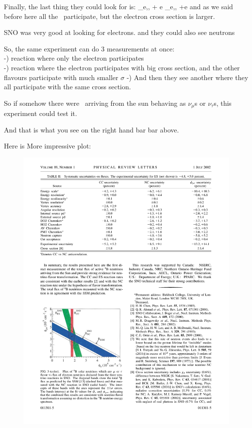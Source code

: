 {Finally,  the last thing they could look for is:
\be
\nu_{e,\mu,\tau} + e  \rightarrow \nu_{e,\mu,\tau} +e
\ee
and as we said before here all the \nus\ participate, but the electron cross section is larger.

SNO was very good at looking for electrons. and they could also see neutrons

So, the same experiment can do 3 measurements at once:\\
 -) reaction where only the electron participates\\
 -) reaction where the electron participates with big cross section, and the other flavours participate with much smaller $\sigma$
 -) And then they see another where they all participate with the same cross section. 


So if somehow there were \nus\ arriving from the sun behaving as $\nu_\mu$s or $\nu_\tau$s, this experiment could test it. 

And that is what you see on the right hand bar bar above. 

Here is More impressive plot: 

\begin{figure}[h!]
\centering
\includegraphics[width=1.0\textwidth]{./SNOResult.pdf}
\end{figure}

}
